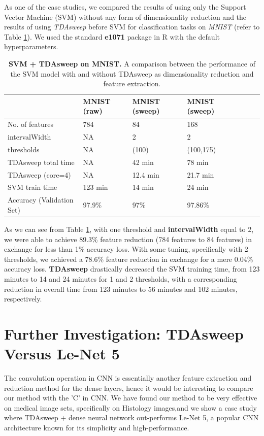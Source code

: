 \documentclass{article}
\begin{document}
As one of the case studies, we compared the results of using only the Support Vector Machine (SVM) without any form of dimensionality reduction and the results of using \emph{TDAsweep} before SVM for classification tasks on \emph{MNIST} (refer to Table \ref{mnist}). We used the standard \textbf{e1071} package in R with the default hyperparameters.

\begin{table}[!ht]
\centering
\caption{{\bf SVM + TDAsweep on MNIST.} A comparison between the performance of the SVM model with and without TDAsweep as dimensionality reduction and feature extraction.\label{mnist}}
\begin{tabular}{|l|l|l|l|l|l|l|}
\hline
\multicolumn{1}{|l|}{} & \multicolumn{1}{|l|}{\bf MNIST (raw)} & \multicolumn{1}{|l|}{\bf MNIST (sweep)} & \multicolumn{1}{|l|}{\bf MNIST (sweep)}\\ \hline
No. of features & 784 & 84 & 168  \\ \hline
intervalWidth & NA & 2 & 2  \\ \hline
thresholds & NA & (100) & (100,175)  \\ \hline
TDAsweep total time & NA & 42 min & 78 min  \\ \hline
TDAsweep (core=4) & NA & 12.4 min & 21.7 min  \\ \hline
SVM train time & 123 min & 14 min & 24 min  \\ \hline
Accuracy (Validation Set) & 97.9\% & 97\% & 97.86\% \\ \hline
\end{tabular}
\label{mnist}
\end{table}

As we can see from Table \ref{mnist}, with one threshold and \textbf{intervalWidth} equal to 2, we were able to achieve 89.3\% feature reduction (784 features to 84 features) in exchange for less than 1\% accuracy loss. With some tuning, specifically with 2 thresholds, we achieved a 78.6\% feature reduction in exchange for a mere 0.04\% accuracy loss. \textbf{TDAsweep} drastically decreased the SVM training time, from 123 minutes to 14 and 24 minutes for 1 and 2 thresholds, with a corresponding reduction in overall time from 123 minutes to 56 minutes and 102 minutes, respectively.

\section{Further Investigation: TDAsweep Versus Le-Net 5}
The convolution operation in CNN is essentially another feature extraction and reduction method for the dense layers, hence it would be interesting to compare our method with the 'C' in CNN. We have found our method to be very effective on medical image sets, specifically on Histology images,and we show a case study where TDAsweep + dense neural network out-performs Le-Net 5, a popular CNN architecture known for its simplicity and high-performance. 
\end{document}
